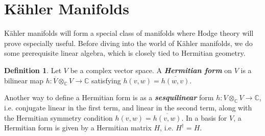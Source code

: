 \documentclass[psamsfonts, 12pt]{amsart}
\theoremstyle{definition}
\newtheorem{defn}[thm]{Definition}
\theoremstyle{remark}
\newcommand{\ib}[1]{\textbf{\textit{#1}}}
\newcommand{\C}{\mathbb{C}}
\begin{document}
\section{K\"ahler Manifolds}
%
K\"ahler manifolds will form a special class of manifolds where Hodge theory
will prove especially useful. Before diving into the world of K\"ahler manifolds,
we do some prerequisite linear algebra, which is closely tied to Hermitian geometry.
%
\begin{defn}
Let $V$ be a complex vector space. A \ib{Hermitian form} on $V$ is a bilinear map
$h : \overline{V} \otimes_\C V \to \C$ satisfying $h(v,w) = \overline{h(w,v)}$.
\end{defn}
%
Another way to define a Hermitian form is as a \ib{sesquilinear} form
$h : V \otimes_\C V \to \C$, i.e. conjugate linear in the first term, and linear in the
second term, along with the Hermitian symmetry condition $h(v,w) = \overline{h(v,w)}$.
In a basis for $V$, a Hermitian form is given by a Hermitian matrix $H$, i.e.
$H^\dagger = H$. \\
\end{document}
